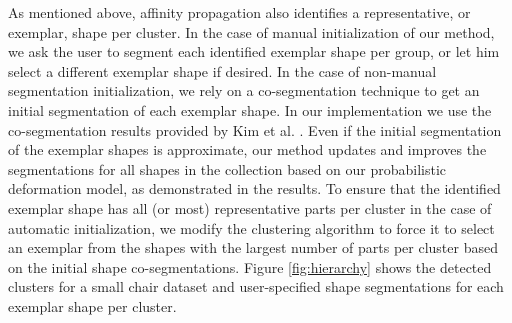 As mentioned above, affinity propagation also identifies a representative, or exemplar, shape per cluster. In the case of manual initialization of our method, we ask the user to segment each identified exemplar shape per group, or let him select a different exemplar shape if desired. In the case of non-manual segmentation initialization, we rely on a co-segmentation technique to get an initial segmentation of each exemplar shape. In our implementation we use the co-segmentation results provided by Kim et al. . Even if the initial segmentation of the exemplar shapes is approximate, our method updates and improves the segmentations for all shapes in the collection based on our probabilistic deformation model, as demonstrated in the results. To ensure that the identified exemplar shape has all (or most) representative parts per cluster in the case of automatic initialization, we modify the clustering algorithm to force it to select an exemplar from the shapes with the largest number of parts per cluster based on the initial shape co-segmentations. Figure \ref{fig:hierarchy} shows the detected clusters for a small chair dataset and user-specified shape segmentations for each exemplar shape per cluster. 

